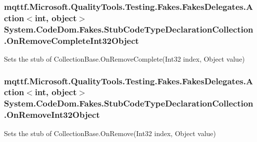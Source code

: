 \hypertarget{class_system_1_1_code_dom_1_1_fakes_1_1_stub_code_type_declaration_collection_a82ec6fce6045b3649f2397dd66b7b726}{
\subsubsection[{On\-Remove\-Complete\-Int32\-Object}]{\setlength{\rightskip}{0pt plus 5cm}mqttf.\-Microsoft.\-Quality\-Tools.\-Testing.\-Fakes.\-Fakes\-Delegates.\-Action$<$int, object$>$ System.\-Code\-Dom.\-Fakes.\-Stub\-Code\-Type\-Declaration\-Collection.\-On\-Remove\-Complete\-Int32\-Object}}\label{class_system_1_1_code_dom_1_1_fakes_1_1_stub_code_type_declaration_collection_a82ec6fce6045b3649f2397dd66b7b726}


Sets the stub of Collection\-Base.\-On\-Remove\-Complete(\-Int32 index, Object value)

\hypertarget{class_system_1_1_code_dom_1_1_fakes_1_1_stub_code_type_declaration_collection_aab8a1bc1cd49bea54f9b9b95fa0436a1}{
\subsubsection[{On\-Remove\-Int32\-Object}]{\setlength{\rightskip}{0pt plus 5cm}mqttf.\-Microsoft.\-Quality\-Tools.\-Testing.\-Fakes.\-Fakes\-Delegates.\-Action$<$int, object$>$ System.\-Code\-Dom.\-Fakes.\-Stub\-Code\-Type\-Declaration\-Collection.\-On\-Remove\-Int32\-Object}}\label{class_system_1_1_code_dom_1_1_fakes_1_1_stub_code_type_declaration_collection_aab8a1bc1cd49bea54f9b9b95fa0436a1}


Sets the stub of Collection\-Base.\-On\-Remove(\-Int32 index, Object value)

